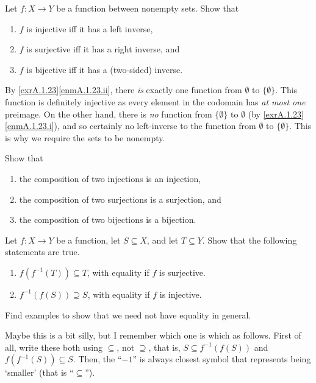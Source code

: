 \begin{exr}
Let $f:X\rightarrow Y$ be a function between nonempty sets.  Show that
\begin{enumerate}\label{exrA.1.9}
\item \label{enmA.1.9.i}$f$ is injective iff it has a left inverse,
\item \label{enmA.1.9.ii}$f$ is surjective iff it has a right inverse, and
\item \label{enmA.1.9.iii}$f$ is bijective iff it has a (two-sided) inverse.
\end{enumerate}
\begin{rmk}
By \cref{exrA.1.23}\ref{enmA.1.23.ii}, there \emph{is} exactly one function from $\emptyset$ to $\{ \emptyset \}$.  This function is definitely injective as every element in the codomain has \emph{at most one} preimage.  On the other hand, there is \emph{no} function from $\{ \emptyset \}$ to $\emptyset$ (by \cref{exrA.1.23}\ref{enmA.1.23.i}), and so certainly no left-inverse to the function from $\emptyset$ to $\{ \emptyset \}$.  This is why we require the sets to be nonempty.
\end{rmk}
\end{exr}
\begin{exr}\label{exrA.1.10}
Show that
\begin{enumerate}
\item the composition of two injections is an injection,
\item the composition of two surjections is a surjection, and
\item the composition of two bijections is a bijection.
\end{enumerate}
\end{exr}
\begin{exr}\label{exrA.1.47}
Let $f:X\rightarrow Y$ be a function, let $S\subseteq X$, and let $T\subseteq Y$.  Show that the following statements are true.
\begin{enumerate}
\item \label{enmA.1.47.i}$f\left( f^{-1}(T)\right) \subseteq T$, with equality if $f$ is surjective.
\item \label{enmA.1.47.ii}$f^{-1}\left( f(S)\right) \supseteq S$, with equality if $f$ is injective.
\end{enumerate}
Find examples to show that we need not have equality in general.
\begin{rmk}
Maybe this is a bit silly, but I remember which one is which as follows.  First of all, write these both using $\subseteq$, not $\supseteq$, that is, $S\subseteq f^{-1}(f(S))$ and $f(f^{-1}(S))\subseteq S$.  Then, the ``$-1$'' is always closest symbol that represents being `smaller' (that is ``$\subseteq$'').
\end{rmk}
\end{exr}
